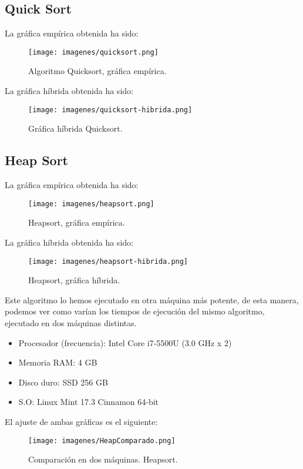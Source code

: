 \documentclass[a4paper, 11pt]{article} %
\begin{document}
\subsection{Quick Sort}
La gráfica empírica obtenida ha sido:
\begin{figure}[htb]
	\centering
	\texttt{[image: imagenes/quicksort.png]}
	\caption{Algoritmo Quicksort, gráfica empírica. }
	\label{fig:E9}
\end{figure}
	
La gráfica híbrida obtenida ha sido:
\begin{figure}[htb]
	\centering
	\texttt{[image: imagenes/quicksort-hibrida.png]}
	\caption{Gráfica híbrida Quicksort.}
	\label{fig:E10}
\end{figure}

\subsection{Heap Sort}
La gráfica empírica obtenida ha sido:
\begin{figure}[htb]
	\centering
	\texttt{[image: imagenes/heapsort.png]}
	\caption{Heapsort, gráfica empírica.}
	\label{fig:E11}
\end{figure}
	
La gráfica híbrida obtenida ha sido:
\begin{figure}[htb]
	\centering
	\texttt{[image: imagenes/heapsort-hibrida.png]}
	\caption{Heapsort, gráfica híbrida.}
	\label{fig:E12}
\end{figure}
Este algoritmo lo hemos ejecutado en otra máquina más potente, de esta manera, podemos ver como varían los tiempos de ejecución del mismo algoritmo, ejecutado en dos máquinas distintas.
\begin{itemize}
	\item Procesador (frecuencia): Intel Core i7-5500U (3.0 GHz x 2)
	\item Memoria RAM: 4 GB
	\item Disco duro: SSD 256 GB
	\item S.O: Linux Mint 17.3 Cinnamon 64-bit
\end{itemize}
El ajuste de ambas gráficas es el siguiente:
\begin{figure}[htb]
	\centering
	\texttt{[image: imagenes/HeapComparado.png]}
	\caption{Comparación en dos máquinas. Heapsort.}
	\label{fig:E13}
\end{figure}
\end{document}
